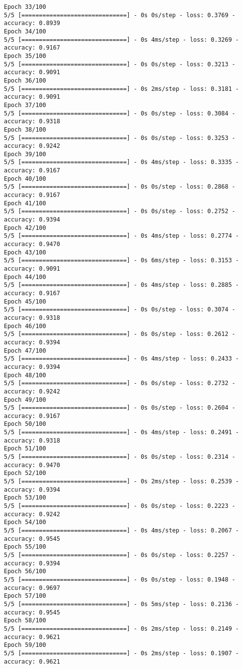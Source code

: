 \documentclass[12pt]{article}
\begin{document}
\begin{lstlisting}
Epoch 33/100
5/5 [==============================] - 0s 0s/step - loss: 0.3769 - accuracy: 0.8939
Epoch 34/100
5/5 [==============================] - 0s 4ms/step - loss: 0.3269 - accuracy: 0.9167
Epoch 35/100
5/5 [==============================] - 0s 0s/step - loss: 0.3213 - accuracy: 0.9091
Epoch 36/100
5/5 [==============================] - 0s 2ms/step - loss: 0.3181 - accuracy: 0.9091
Epoch 37/100
5/5 [==============================] - 0s 0s/step - loss: 0.3084 - accuracy: 0.9318
Epoch 38/100
5/5 [==============================] - 0s 0s/step - loss: 0.3253 - accuracy: 0.9242
Epoch 39/100
5/5 [==============================] - 0s 4ms/step - loss: 0.3335 - accuracy: 0.9167
Epoch 40/100
5/5 [==============================] - 0s 0s/step - loss: 0.2868 - accuracy: 0.9167
Epoch 41/100
5/5 [==============================] - 0s 0s/step - loss: 0.2752 - accuracy: 0.9394
Epoch 42/100
5/5 [==============================] - 0s 4ms/step - loss: 0.2774 - accuracy: 0.9470
Epoch 43/100
5/5 [==============================] - 0s 6ms/step - loss: 0.3153 - accuracy: 0.9091
Epoch 44/100
5/5 [==============================] - 0s 4ms/step - loss: 0.2885 - accuracy: 0.9167
Epoch 45/100
5/5 [==============================] - 0s 0s/step - loss: 0.3074 - accuracy: 0.9318
Epoch 46/100
5/5 [==============================] - 0s 0s/step - loss: 0.2612 - accuracy: 0.9394
Epoch 47/100
5/5 [==============================] - 0s 4ms/step - loss: 0.2433 - accuracy: 0.9394
Epoch 48/100
5/5 [==============================] - 0s 0s/step - loss: 0.2732 - accuracy: 0.9242
Epoch 49/100
5/5 [==============================] - 0s 0s/step - loss: 0.2604 - accuracy: 0.9167
Epoch 50/100
5/5 [==============================] - 0s 4ms/step - loss: 0.2491 - accuracy: 0.9318
Epoch 51/100
5/5 [==============================] - 0s 0s/step - loss: 0.2314 - accuracy: 0.9470
Epoch 52/100
5/5 [==============================] - 0s 2ms/step - loss: 0.2539 - accuracy: 0.9394
Epoch 53/100
5/5 [==============================] - 0s 0s/step - loss: 0.2223 - accuracy: 0.9242
Epoch 54/100
5/5 [==============================] - 0s 4ms/step - loss: 0.2067 - accuracy: 0.9545
Epoch 55/100
5/5 [==============================] - 0s 0s/step - loss: 0.2257 - accuracy: 0.9394
Epoch 56/100
5/5 [==============================] - 0s 0s/step - loss: 0.1948 - accuracy: 0.9697
Epoch 57/100
5/5 [==============================] - 0s 5ms/step - loss: 0.2136 - accuracy: 0.9545
Epoch 58/100
5/5 [==============================] - 0s 2ms/step - loss: 0.2149 - accuracy: 0.9621
Epoch 59/100
5/5 [==============================] - 0s 2ms/step - loss: 0.1907 - accuracy: 0.9621

\end{lstlisting}
\end{document}
